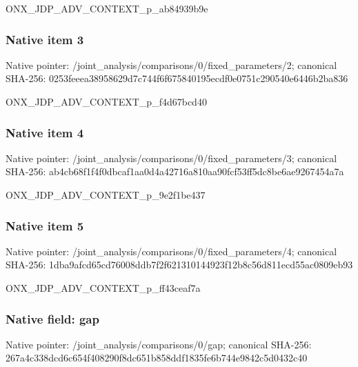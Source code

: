 \documentclass[10pt,a4paper]{article}
\begin{document}
\begingroup\raggedright\sloppy ONX\_\allowbreak{}JDP\_\allowbreak{}ADV\_\allowbreak{}CONTEXT\_\allowbreak{}p\_\allowbreak{}ab84939b9e\par\endgroup

\subsubsection{Native item 3}
Native pointer: /joint\_\allowbreak{}analysis/comparisons/0/fixed\_\allowbreak{}parameters/2; canonical SHA-256: 0253feeea38958629d7c744f6f675840195ecdf0e0751c290540e6446b2ba836

\begingroup\raggedright\sloppy ONX\_\allowbreak{}JDP\_\allowbreak{}ADV\_\allowbreak{}CONTEXT\_\allowbreak{}p\_\allowbreak{}f4d67bcd40\par\endgroup

\subsubsection{Native item 4}
Native pointer: /joint\_\allowbreak{}analysis/comparisons/0/fixed\_\allowbreak{}parameters/3; canonical SHA-256: ab4cb68f1f4f0dbcaf1aa0d4a42716a810aa90fcf53ff5dc8be6ae9267454a7a

\begingroup\raggedright\sloppy ONX\_\allowbreak{}JDP\_\allowbreak{}ADV\_\allowbreak{}CONTEXT\_\allowbreak{}p\_\allowbreak{}9e2f1be437\par\endgroup

\subsubsection{Native item 5}
Native pointer: /joint\_\allowbreak{}analysis/comparisons/0/fixed\_\allowbreak{}parameters/4; canonical SHA-256: 1dba9afcd65cd76008ddb7f2f621310144923f12b8c56d811ecd55ac0809eb93

\begingroup\raggedright\sloppy ONX\_\allowbreak{}JDP\_\allowbreak{}ADV\_\allowbreak{}CONTEXT\_\allowbreak{}p\_\allowbreak{}ff43ceaf7a\par\endgroup

\subsubsection{Native field: gap}
Native pointer: /joint\_\allowbreak{}analysis/comparisons/0/gap; canonical SHA-256: 267a4c338dcd6c654f408290f8dc651b858ddf1835fe6b744e9842c5d0432c40
\end{document}
